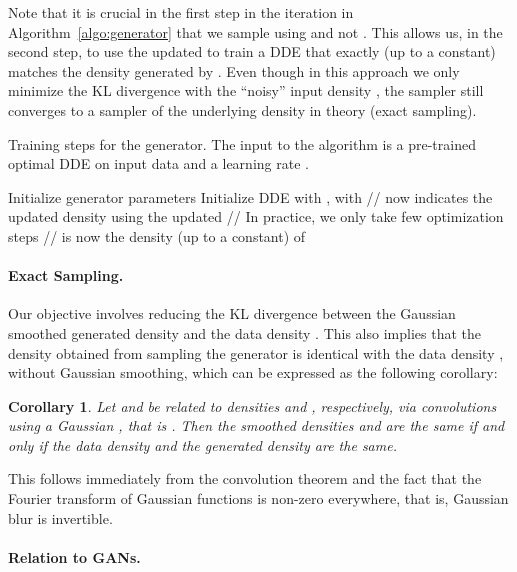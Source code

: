 \documentclass{article}
\newtheorem{corollary}{Corollary}
\begin{document}
Note that it is crucial in the first step in the iteration in Algorithm~\ref{algo:generator} that we sample using  and not . This allows us, in the second step, to use the updated  to train a DDE  that exactly (up to a constant) matches the density generated by . Even though in this approach we only minimize the KL divergence with the ``noisy'' input density , the sampler  still converges to a sampler of the underlying density  in theory (exact sampling).

\begin{algorithm}
\caption{Training steps for the generator. The input to the algorithm is a pre-trained optimal DDE on input data  and a learning rate .}
	\label{algo:generator}
	\begin{algorithmic}[1]
		\STATE Initialize generator parameters  
		\STATE Initialize DDE  with 
			\STATE , with 
			\STATE //  now indicates the updated density using the updated 
			\STATE  // In practice, we only take few optimization steps
			\STATE //  is now the density (up to a constant) of 
 		\ENDWHILE
	\end{algorithmic}
\end{algorithm}





\paragraph{Exact Sampling.}

Our objective involves reducing the KL divergence between the Gaussian smoothed generated density  and the data density . This also implies that the density  obtained from sampling the generator  is identical with the data density , without Gaussian smoothing, which can be expressed as the following corollary:

\begin{corollary}
Let  and  be related to densities  and , respectively, via convolutions using a Gaussian , that is . Then the smoothed densities  and  are the same if and only if the data density  and the generated density  are the same.
\end{corollary}

This follows immediately from the convolution theorem and the fact that the Fourier transform of Gaussian functions is non-zero everywhere, that is, Gaussian blur is invertible.

\paragraph{Relation to GANs.}
\end{document}
